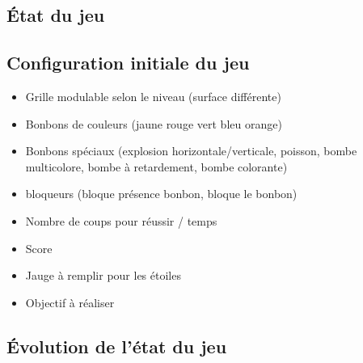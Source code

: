 \subsection{État du jeu}

\subsection{Configuration initiale du jeu}
\begin{itemize}
        \item 
        Grille modulable selon le niveau (surface différente)
        \item 
        Bonbons de couleurs (jaune rouge vert bleu orange)
        \item 
        Bonbons spéciaux (explosion horizontale/verticale, poisson, bombe multicolore, bombe à retardement, bombe colorante)
        \item 
        bloqueurs (bloque présence bonbon, bloque le bonbon)
        \item 
        Nombre de coups pour réussir / temps
        \item 
        Score
        \item 
        Jauge à remplir pour les étoiles
        \item 
        Objectif à réaliser
\end{itemize}

\subsection{Évolution de l'état du jeu}
